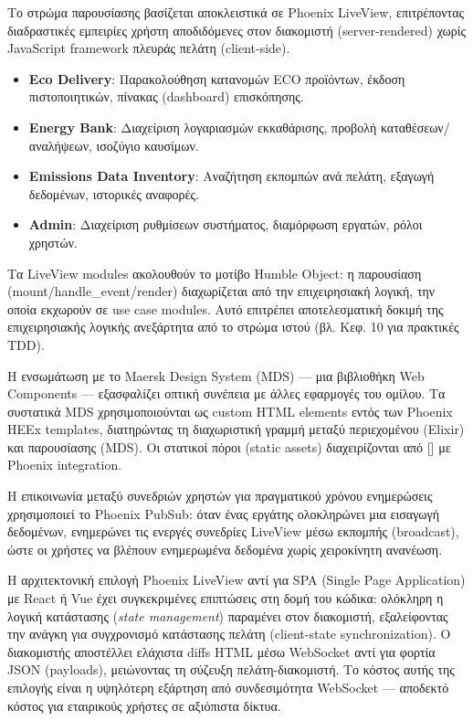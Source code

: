 \documentclass[11pt,a4paper,greek,twoside]{template-xe}
\let\origtexttt\texttt
\renewcommand{\texttt}[1]{%
  \begingroup
  \StrSubstitute{#1}{.}{.\allowbreak}[\tttmp]%
  \origtexttt{\tttmp}%
  \endgroup
}
\providecommand{\tightlist}{\setlength{\itemsep}{0pt}\setlength{\parskip}{0pt}}
\begin{document}
Το στρώμα παρουσίασης βασίζεται αποκλειστικά σε Phoenix LiveView,
επιτρέποντας διαδραστικές εμπειρίες χρήστη αποδιδόμενες στον διακομιστή
(server-rendered) χωρίς JavaScript framework πλευράς πελάτη
(client-side).

\begin{itemize}
\tightlist
\item
  \textbf{Eco Delivery}: Παρακολούθηση κατανομών ECO προϊόντων, έκδοση
  πιστοποιητικών, πίνακας (dashboard) επισκόπησης.
\item
  \textbf{Energy Bank}: Διαχείριση λογαριασμών εκκαθάρισης, προβολή
  καταθέσεων/αναλήψεων, ισοζύγιο καυσίμων.
\item
  \textbf{Emissions Data Inventory}: Αναζήτηση εκπομπών ανά πελάτη,
  εξαγωγή δεδομένων, ιστορικές αναφορές.
\item
  \textbf{Admin}: Διαχείριση ρυθμίσεων συστήματος, διαμόρφωση εργατών,
  ρόλοι χρηστών.
\end{itemize}

Τα LiveView modules ακολουθούν το μοτίβο Humble Object: η παρουσίαση
(mount/handle\_event/render) διαχωρίζεται από την επιχειρησιακή λογική,
την οποία εκχωρούν σε use case modules. Αυτό επιτρέπει αποτελεσματική
δοκιμή της επιχειρησιακής λογικής ανεξάρτητα από το στρώμα ιστού (βλ.
Κεφ. 10 για πρακτικές TDD).

Η ενσωμάτωση με το Maersk Design System (MDS) --- μια βιβλιοθήκη Web
Components --- εξασφαλίζει οπτική συνέπεια με άλλες εφαρμογές του
ομίλου. Τα συστατικά MDS χρησιμοποιούνται ως custom HTML elements εντός
των Phoenix HEEx templates, διατηρώντας τη διαχωριστική γραμμή μεταξύ
περιεχομένου (Elixir) και παρουσίασης (MDS). Οι στατικοί πόροι (static
assets) διαχειρίζονται από \texttt{esbuild} με Phoenix integration.

Η επικοινωνία μεταξύ συνεδριών χρηστών για πραγματικού χρόνου
ενημερώσεις χρησιμοποιεί το Phoenix PubSub: όταν ένας εργάτης
ολοκληρώνει μια εισαγωγή δεδομένων, ενημερώνει τις ενεργές συνεδρίες
LiveView μέσω εκπομπής (broadcast), ώστε οι χρήστες να βλέπουν
ενημερωμένα δεδομένα χωρίς χειροκίνητη ανανέωση.

Η αρχιτεκτονική επιλογή Phoenix LiveView αντί για SPA (Single Page
Application) με React ή Vue έχει συγκεκριμένες επιπτώσεις στη δομή του
κώδικα: ολόκληρη η λογική κατάστασης (\emph{state management}) παραμένει
στον διακομιστή, εξαλείφοντας την ανάγκη για συγχρονισμό κατάστασης
πελάτη (client-state synchronization). Ο διακομιστής αποστέλλει ελάχιστα
diffs HTML μέσω WebSocket αντί για φορτία JSON (payloads), μειώνοντας τη
σύζευξη πελάτη-διακομιστή. Το κόστος αυτής της επιλογής είναι η
υψηλότερη εξάρτηση από συνδεσιμότητα WebSocket --- αποδεκτό κόστος για
εταιρικούς χρήστες σε αξιόπιστα δίκτυα.
\end{document}
